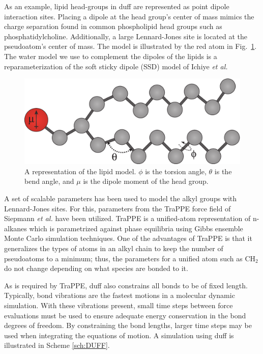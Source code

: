 \documentclass[]{book}
\begin{document}
As an example, lipid head-groups in {\sc duff} are represented as
point dipole interaction sites.  Placing a dipole at the head group's
center of mass mimics the charge separation found in common
phospholipid head groups such as phosphatidylcholine.\cite{Cevc87}
Additionally, a large Lennard-Jones site is located at the
pseudoatom's center of mass. The model is illustrated by the red atom
in Fig.~\ref{fig:lipidModel}. The water model we use to
complement the dipoles of the lipids is a
reparameterization\cite{fennell04} of the soft sticky dipole (SSD)
model of Ichiye
\emph{et al.}\cite{liu96:new_model}

\begin{figure}
\centering
\includegraphics[width=\linewidth]{lipidModel.pdf}
\caption[A representation of a lipid model in {\sc duff}]{A
representation of the lipid model. $\phi$ is the torsion angle,
$\theta$ is the bend angle, and $\mu$ is the dipole moment of the head
group.}
\label{fig:lipidModel}
\end{figure}

A set of scalable parameters has been used to model the alkyl groups
with Lennard-Jones sites. For this, parameters from the TraPPE force
field of Siepmann \emph{et al.}\cite{Siepmann1998} have been
utilized. TraPPE is a unified-atom representation of n-alkanes which
is parametrized against phase equilibria using Gibbs ensemble Monte
Carlo simulation techniques.\cite{Siepmann1998} One of the advantages
of TraPPE is that it generalizes the types of atoms in an alkyl chain
to keep the number of pseudoatoms to a minimum; thus, the parameters
for a unified atom such as $\text{CH}_2$ do not change depending on
what species are bonded to it.

As is required by TraPPE, {\sc duff} also constrains all bonds to be
of fixed length. Typically, bond vibrations are the fastest motions in
a molecular dynamic simulation.  With these vibrations present, small
time steps between force evaluations must be used to ensure adequate
energy conservation in the bond degrees of freedom. By constraining
the bond lengths, larger time steps may be used when integrating the
equations of motion. A simulation using {\sc duff} is illustrated in
Scheme \ref{sch:DUFF}.
\end{document}
